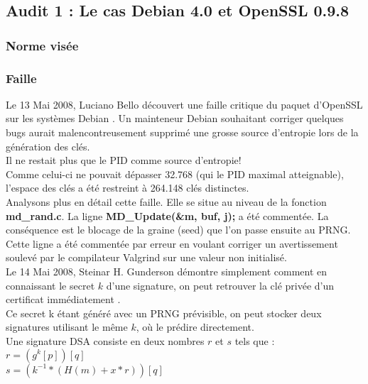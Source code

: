 	\subsection{Audit 1 : Le cas Debian 4.0 et OpenSSL 0.9.8}
		\subsubsection{Norme visée}
		\subsubsection{Faille}
			Le 13 Mai 2008, Luciano Bello découvert une faille critique du 
			paquet d'OpenSSL sur les systèmes Debian
			\cite{faille2008linux.org}. Un mainteneur Debian 	
			souhaitant corriger quelques bugs aurait malencontreusement 	
			supprimé une grosse source d'entropie lors de la génération des 
			clés. \\
			Il ne restait plus que le PID comme source d'entropie!\\
			Comme celui-ci ne pouvait dépasser 32.768 (qui le PID maximal
			atteignable), l'espace des clés a été restreint à 264.148 clés
			distinctes.\\
			
			Analysons plus en détail cette faille. Elle se situe au niveau de 
			la fonction \textbf{md\_rand.c}.
			La ligne \textbf{MD\_Update(\&m, buf, j);} a été commentée.
			La conséquence est le blocage de la graine (seed) que l'on 
			passe ensuite au PRNG.\\
		
			Cette ligne a été commentée par erreur en voulant corriger un
			avertissement soulevé par le compilateur Valgrind sur une valeur
			non initialisé.\\
		
			Le 14 Mai 2008, Steinar H. Gunderson démontre simplement comment
			en connaissant le secret $k$ d'une signature, on peut retrouver
			la clé privée d'un certificat immédiatement \cite{gunderson2008}.\\
		
			Ce secret k étant généré avec un PRNG prévisible, on peut stocker
			deux signatures utilisant le même $k$, où le prédire directement.\\
		
			Une signature DSA consiste en deux nombres $r$ et $s$ tels que :\\
			$r = (g^k [p]) [q]$\\
			$s = (k^{-1} * (H(m) + x * r)) [q]$\\
		
